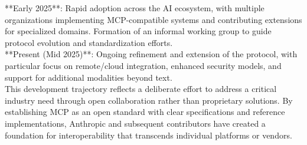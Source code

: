 **Early 2025**: Rapid adoption across the AI ecosystem, with multiple organizations implementing MCP-compatible systems and contributing extensions for specialized domains. Formation of an informal working group to guide protocol evolution and standardization efforts.\\ \newline
**Present (Mid 2025)**: Ongoing refinement and extension of the protocol, with particular focus on remote/cloud integration, enhanced security models, and support for additional modalities beyond text.\\ \newline
This development trajectory reflects a deliberate effort to address a critical industry need through open collaboration rather than proprietary solutions. By establishing MCP as an open standard with clear specifications and reference implementations, Anthropic and subsequent contributors have created a foundation for interoperability that transcends individual platforms or vendors.\\

